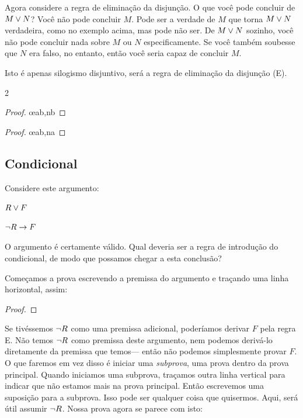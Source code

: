 Agora considere a regra de eliminação da disjunção. O que você pode concluir de $M \vee N$? Você não pode concluir $M$. Pode ser a verdade de $M$ que torna $M \vee N$ verdadeira, como no exemplo acima, mas pode não ser. De $M \vee N$ sozinho, você não pode concluir nada sobre $M$ ou $N$ especificamente. Se você também soubesse que $N$ era falso, no entanto, então você seria capaz de concluir $M$.

Isto é apenas silogismo disjuntivo, será a regra de eliminação da disjunção ({\eor}E).
\begin{multicols}{2}
\begin{proof}
	 \oe{ab,nb}
\end{proof}

\begin{proof}
 \oe{ab,na}
\end{proof}

\end{multicols}

\subsection{Condicional}

Considere este argumento:
\begin{earg}
\item[] $R \vee F$
\item[\therefore] $\neg R \rightarrow F$
\end{earg}
O argumento é certamente válido. Qual deveria ser a regra de introdução do condicional, de modo que possamos chegar a esta conclusão?

Começamos a prova escrevendo a premissa do argumento e traçando uma linha horizontal, assim:

\begin{proof}
\end{proof}

Se tivéssemos $\neg R$ como uma premissa adicional, poderíamos derivar $F$ pela regra {\eor}E. Não temos $\neg R$ como premissa deste argumento, nem podemos derivá-lo diretamente da premissa que temos--- então não podemos simplesmente provar $F$. O que faremos em vez disso é iniciar uma \emph{subprova}, uma prova dentro da prova principal. Quando iniciamos uma subprova, traçamos outra linha vertical para indicar que não estamos mais na prova principal. Então escrevemos uma suposição para a subprova. Isso pode ser qualquer coisa que quisermos. Aqui, será útil assumir $\neg R$. Nossa prova agora se parece com isto:

